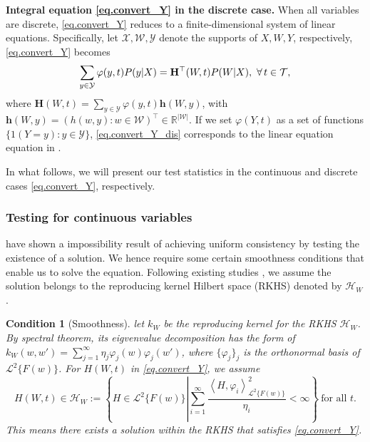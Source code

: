 \documentclass[
  12pt]{article}
\newtheorem{assumption}{Condition}
\def\H{\mathbf{H}}
\def\h{\mathbf{h}}
\def\mR{\mathbb{R}}
\def\cH{\mathcal{H}}
\def\cL{\mathcal{L}}
\def\cT{\mathcal{T}}
\def\cY{\mathcal{Y}}
\begin{document}
\textbf{Integral equation \eqref{eq.convert_Y} in the discrete case.} When all variables are discrete, \eqref{eq.convert_Y} reduces to a finite-dimensional system of linear equations. Specifically, let $\mathcal{X}, \mathcal{W}, \mathcal{Y}$ denote the supports of $X, W, Y$, respectively, \eqref{eq.convert_Y} becomes
\begin{equation}
\label{eq.convert_Y_dis}
\sum_{y\in\mathcal{Y}}\varphi(y,t)P(y|X)= \H^\top(W,t)P(W|X), \ \forall \thinspace t \in \cT,
\end{equation}
where $\H(W,t)=\sum_{y\in\mathcal{Y}}\varphi(y,t)\h(W,y)$, with $\h(W,y)=(h(w,y): w\in\mathcal{W})^\top \in \mR^{|\mathcal{W}|}$. If we set $\varphi(Y,t)$ as a set of functions $\{1(Y=y): y \in \cY\}$, \eqref{eq.convert_Y_dis} corresponds to the linear equation equation in \citet{miao2018identifying}. 



In what follows, we will present our test statistics in the continuous and discrete cases \eqref{eq.convert_Y}, respectively. 

\subsubsection{Testing for continuous variables}
\label{sec.test_continuous}

\cite{horowitz2012specification} have shown a impossibility result of achieving uniform consistency by testing the existence of a solution. We hence require some certain smoothness conditions that enable us to solve the equation. Following existing studies \citep{mastouri2021proximal, ghassami2022minimax}, we assume the solution belongs to the reproducing kernel Hilbert space (RKHS) denoted by $\mathcal{H}_W$. 


\begin{assumption}[Smoothness]\label{picard_series}
let $k_W$ be the reproducing kernel for the RKHS $\cH_W$. By spectral theorem, its eigvenvalue decomposition has the form of $k_W(w,w')=\sum_{j=1}^\infty\eta_j\varphi_j(w)\varphi_j(w')$, where $\{\varphi_j\}_j$ is the orthonormal basis of $\cL^2\{F(w)\}$. 
For $H(W, t) $ in \eqref{eq.convert_Y}, we assume 
$$
H(W, t) \in \cH_W:=\left\{H\in \cL^2\{F(w)\}\left|\sum_{i=1}^\infty\frac{\left\langle H,\varphi_i\right\rangle_{\cL^2\{F(w)\}}^2}{\eta_i}<\infty\right\}\right. \ \text{for all $t $.}
$$
This means there exists a solution within the RKHS that satisfies \eqref{eq.convert_Y}.  
\end{assumption}
\end{document}
